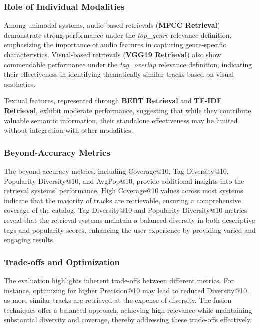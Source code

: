 \documentclass[sigconf]{acmart}
\begin{document}
\subsubsection{Role of Individual Modalities}

Among unimodal systems, audio-based retrievals (\textbf{MFCC Retrieval}) demonstrate strong performance under the \textit{top\_genre} relevance definition, emphasizing the importance of audio features in capturing genre-specific characteristics. Visual-based retrievals (\textbf{VGG19 Retrieval}) also show commendable performance under the \textit{tag\_overlap} relevance definition, indicating their effectiveness in identifying thematically similar tracks based on visual aesthetics.

Textual features, represented through \textbf{BERT Retrieval} and \textbf{TF-IDF Retrieval}, exhibit moderate performance, suggesting that while they contribute valuable semantic information, their standalone effectiveness may be limited without integration with other modalities.

\subsubsection{Beyond-Accuracy Metrics}

The beyond-accuracy metrics, including Coverage@10, Tag Diversity@10, Popularity Diversity@10, and AvgPop@10, provide additional insights into the retrieval systems' performance. High Coverage@10 values across most systems indicate that the majority of tracks are retrievable, ensuring a comprehensive coverage of the catalog. Tag Diversity@10 and Popularity Diversity@10 metrics reveal that the retrieval systems maintain a balanced diversity in both descriptive tags and popularity scores, enhancing the user experience by providing varied and engaging results.

\subsubsection{Trade-offs and Optimization}

The evaluation highlights inherent trade-offs between different metrics. For instance, optimizing for higher Precision@10 may lead to reduced Diversity@10, as more similar tracks are retrieved at the expense of diversity. The fusion techniques offer a balanced approach, achieving high relevance while maintaining substantial diversity and coverage, thereby addressing these trade-offs effectively.
\end{document}

